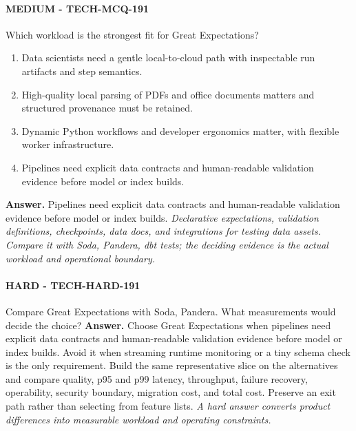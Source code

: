 \paragraph{MEDIUM - TECH-MCQ-191} Which workload is the strongest fit for Great Expectations?
\begin{enumerate}[label=\Alph*.]
\item Data scientists need a gentle local-to-cloud path with inspectable run artifacts and step semantics.
\item High-quality local parsing of PDFs and office documents matters and structured provenance must be retained.
\item Dynamic Python workflows and developer ergonomics matter, with flexible worker infrastructure.
\item Pipelines need explicit data contracts and human-readable validation evidence before model or index builds.
\end{enumerate}
\textbf{Answer.} Pipelines need explicit data contracts and human-readable validation evidence before model or index builds.
\textit{Declarative expectations, validation definitions, checkpoints, data docs, and integrations for testing data assets. Compare it with Soda, Pandera, dbt tests; the deciding evidence is the actual workload and operational boundary.}
\paragraph{HARD - TECH-HARD-191} Compare Great Expectations with Soda, Pandera. What measurements would decide the choice?
\textbf{Answer.} Choose Great Expectations when pipelines need explicit data contracts and human-readable validation evidence before model or index builds. Avoid it when streaming runtime monitoring or a tiny schema check is the only requirement. Build the same representative slice on the alternatives and compare quality, p95 and p99 latency, throughput, failure recovery, operability, security boundary, migration cost, and total cost. Preserve an exit path rather than selecting from feature lists.
\textit{A hard answer converts product differences into measurable workload and operating constraints.}
